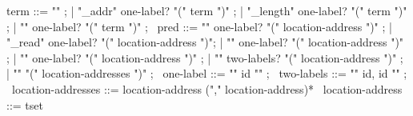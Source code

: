 \begin{syntax}
  term ::= "\null" ;
        | "\base_addr" { one-label? } "(" term ")" ;
        | "\block_length" { one-label? } "(" term ")" ;
        | { "\offset" } one-label?  "(" term ")" ;
       \
  pred ::= "\valid" { one-label? } "(" location-address ")" ;
       |  { "\valid_read" } one-label? "(" location-address ")";
       |  { "\free" } one-label? "(" location-address ")" ;
       |  { "\allocated" } one-label? "(" location-address ")" ;
       |  { "\fresh" } two-labels? "(" location-address ")" ;
       |  "\separated" "(" location-addresses ")" ;
       \
  one-label ::= "{" id "}" ;
       \
  two-labels ::= "{" id, id "}" ;
       \
  location-addresses ::= location-address ("," location-address)*
  \
  location-address ::= tset
\end{syntax}

